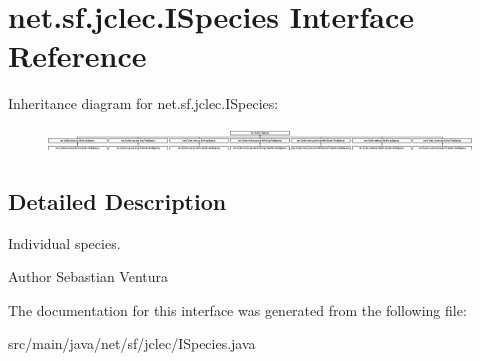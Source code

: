 \hypertarget{interfacenet_1_1sf_1_1jclec_1_1_i_species}{\section{net.\-sf.\-jclec.\-I\-Species Interface Reference}
\label{interfacenet_1_1sf_1_1jclec_1_1_i_species}
}
Inheritance diagram for net.\-sf.\-jclec.\-I\-Species\-:\begin{figure}[H]
\begin{center}
\leavevmode
\includegraphics[height=0.661157cm]{interfacenet_1_1sf_1_1jclec_1_1_i_species}
\end{center}
\end{figure}


\subsection{Detailed Description}
Individual species.

\begin{DoxyAuthor}{Author}
Sebastian Ventura 
\end{DoxyAuthor}


The documentation for this interface was generated from the following file\-:\begin{DoxyCompactItemize}
\item 
src/main/java/net/sf/jclec/I\-Species.\-java\end{DoxyCompactItemize}
